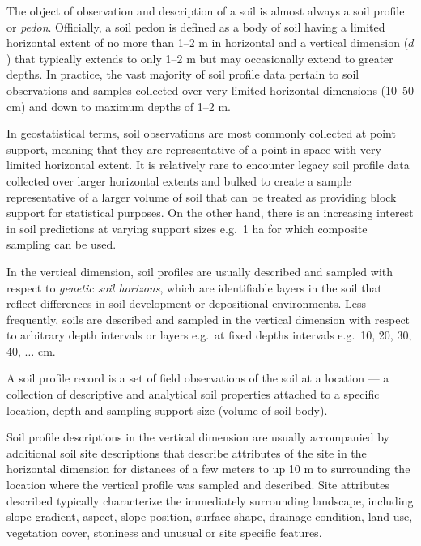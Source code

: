 \documentclass[11pt]{krantz}
\makeatletter
\newenvironment{kframe}{%
\medskip{}
\setlength{\fboxsep}{.8em}
 \def\at@end@of@kframe{}%
 \ifinner\ifhmode%
  \def\at@end@of@kframe{\end{minipage}}%
  \begin{minipage}{\columnwidth}%
 \fi\fi%
 \def\FrameCommand##1{\hskip\@totalleftmargin \hskip-\fboxsep
 \colorbox{shadecolor}{##1}\hskip-\fboxsep
     \hskip-\linewidth \hskip-\@totalleftmargin \hskip\columnwidth}%
 \MakeFramed {\advance\hsize-\width
   \@totalleftmargin\z@ \linewidth\hsize
   \@setminipage}}%
 {\par\unskip\endMakeFramed%
 \at@end@of@kframe}
\newenvironment{rmdblock}[1]
  {
  \begin{itemize}
  \renewcommand{\labelitemi}{
    \raisebox{-.7\height}[0pt][0pt]{
      {\setkeys{Gin}{width=3em,keepaspectratio}\texttt{[image: images/\#1]}}
    }
  }
  \setlength{\fboxsep}{1em}
  \begin{kframe}
  \item
  }
  {
  \end{kframe}
  \end{itemize}
  }
\newenvironment{rmdnote}
  {\begin{rmdblock}{note}}
  {\end{rmdblock}}
\theoremstyle{definition}
\theoremstyle{definition}
\theoremstyle{definition}
\theoremstyle{remark}
\makeatother
\begin{document}
The object of observation and description of a soil is almost always a
soil profile or \emph{pedon}. Officially, a soil pedon is defined as a
body of soil having a limited horizontal extent of no more than 1--2 m
in horizontal and a vertical dimension (\(d\)) that typically extends to
only 1--2 m but may occasionally extend to greater depths. In practice,
the vast majority of soil profile data pertain to soil observations and
samples collected over very limited horizontal dimensions (10--50 cm)
and down to maximum depths of 1--2 m.

In geostatistical terms, soil observations are most commonly collected
at point support, meaning that they are representative of a point in
space with very limited horizontal extent. It is relatively rare to
encounter legacy soil profile data collected over larger horizontal
extents and bulked to create a sample representative of a larger volume
of soil that can be treated as providing block support for statistical
purposes. On the other hand, there is an increasing interest in soil
predictions at varying support sizes e.g.~1 ha for which composite
sampling can be used.

In the vertical dimension, soil profiles are usually described and
sampled with respect to \emph{genetic soil horizons}, which are
identifiable layers in the soil that reflect differences in soil
development or depositional environments. Less frequently, soils are
described and sampled in the vertical dimension with respect to
arbitrary depth intervals or layers e.g.~at fixed depths intervals
e.g.~10, 20, 30, 40, \(\ldots\) cm.

\begin{rmdnote}
A soil profile record is a set of field observations of the soil at a
location --- a collection of descriptive and analytical soil properties
attached to a specific location, depth and sampling support size (volume
of soil body).
\end{rmdnote}

Soil profile descriptions in the vertical dimension are usually
accompanied by additional soil site descriptions that describe
attributes of the site in the horizontal dimension for distances of a
few meters to up 10 m to surrounding the location where the vertical
profile was sampled and described. Site attributes described typically
characterize the immediately surrounding landscape, including slope
gradient, aspect, slope position, surface shape, drainage condition,
land use, vegetation cover, stoniness and unusual or site specific
features.
\end{document}
